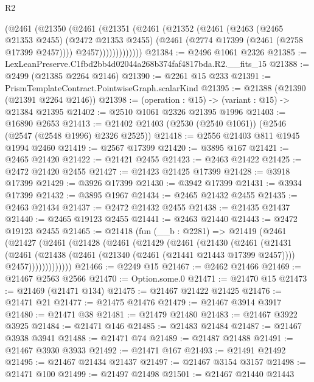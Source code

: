 \begin{lexlean}{R2}
\begin{coremodule}
              (@2461
                (@21350
                  (@2461
                    (@21351
                      (@2461
                        (@21352
                          (@2461
                            (@2463
                              (@2465 @21353 @2455)
                              (@2472 @21353 @2455)
                              (@2461 (@2774 @17399 (@2461 (@2758 @17399 @2457))))
                              @2457)))))))))))))
@21384 := @2496 @1061 @2326
@21385 := LexLeanPreserve.C1fbd2bb4d02044a268b374faf4817bda.R2.__fits_15
@21388 := @2499 (@21385 @2264 @2146)
@21390 := @2261 @15 @233
@21391 := PrismTemplateContract.PointwiseGraph.scalarKind
@21395 := @21388 (@21390 (@21391 @2264 @2146))
@21398 := (operation : @15) -> (variant : @15) -> @21384 @21395
@21402 := @2510 @1061 @2326 @21395 @1996
@21403 := @16890 @2653
@21413 := @21402 @21403 (@2530 (@2540 @1061)) (@2546 (@2547 (@2548 @1996) @2326 @2525))
@21418 := @2556 @21403 @811 @1945 @1994 @2460
@21419 := @2567 @17399
@21420 := @3895 @167
@21421 := @2465 @21420
@21422 := @21421 @2455
@21423 := @2463 @21422
@21425 := @2472 @21420 @2455
@21427 := @21423 @21425 @17399
@21428 := @3918 @17399
@21429 := @3926 @17399
@21430 := @3942 @17399
@21431 := @3934 @17399
@21432 := @3895 @1967
@21434 := @2465 @21432 @2455
@21435 := @2463 @21434
@21437 := @2472 @21432 @2455
@21438 := @21435 @21437
@21440 := @2465 @19123 @2455
@21441 := @2463 @21440
@21443 := @2472 @19123 @2455
@21465 := @21418
    (fun (__b : @2281) =>
    @21419
      (@2461
        (@21427
          (@2461
            (@21428
              (@2461
                (@21429
                  (@2461
                    (@21430
                      (@2461
                        (@21431
                          (@2461
                            (@21438
                              (@2461 (@21340 (@2461 (@21441 @21443 @17399 @2457))))
                              @2457)))))))))))))
@21466 := @2249 @15
@21467 := @2462 @21466
@21469 := @21467 @2563 @2566
@21470 := Option.some.{0}
@21471 := @21470 @15
@21473 := @21469 (@21471 @134)
@21475 := @21467 @21422 @21425
@21476 := @21471 @21
@21477 := @21475 @21476
@21479 := @21467 @3914 @3917
@21480 := @21471 @38
@21481 := @21479 @21480
@21483 := @21467 @3922 @3925
@21484 := @21471 @146
@21485 := @21483 @21484
@21487 := @21467 @3938 @3941
@21488 := @21471 @74
@21489 := @21487 @21488
@21491 := @21467 @3930 @3933
@21492 := @21471 @167
@21493 := @21491 @21492
@21495 := @21467 @21434 @21437
@21497 := @21467 @3154 @3157
@21498 := @21471 @100
@21499 := @21497 @21498
@21501 := @21467 @21440 @21443

\end{coremodule}
\end{lexlean}
